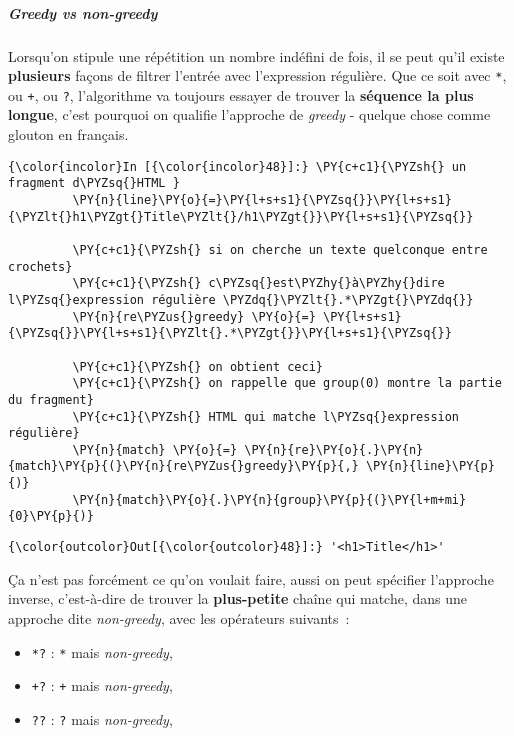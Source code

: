     \hypertarget{greedy-vs-non-greedy}{%
\subparagraph{\texorpdfstring{Greedy \emph{vs}
non-greedy}{Greedy vs non-greedy}}\label{greedy-vs-non-greedy}}

    Lorsqu'on stipule une répétition un nombre indéfini de fois, il se peut
qu'il existe \textbf{plusieurs} façons de filtrer l'entrée avec
l'expression régulière. Que ce soit avec \texttt{*}, ou \texttt{+}, ou
\texttt{?}, l'algorithme va toujours essayer de trouver la
\textbf{séquence la plus longue}, c'est pourquoi on qualifie l'approche
de \emph{greedy} - quelque chose comme glouton en français.

    \begin{Verbatim}[commandchars=\\\{\},frame=single,framerule=0.3mm,rulecolor=\color{cellframecolor}]
{\color{incolor}In [{\color{incolor}48}]:} \PY{c+c1}{\PYZsh{} un fragment d\PYZsq{}HTML }
         \PY{n}{line}\PY{o}{=}\PY{l+s+s1}{\PYZsq{}}\PY{l+s+s1}{\PYZlt{}h1\PYZgt{}Title\PYZlt{}/h1\PYZgt{}}\PY{l+s+s1}{\PYZsq{}}
         
         \PY{c+c1}{\PYZsh{} si on cherche un texte quelconque entre crochets}
         \PY{c+c1}{\PYZsh{} c\PYZsq{}est\PYZhy{}à\PYZhy{}dire l\PYZsq{}expression régulière \PYZdq{}\PYZlt{}.*\PYZgt{}\PYZdq{}}
         \PY{n}{re\PYZus{}greedy} \PY{o}{=} \PY{l+s+s1}{\PYZsq{}}\PY{l+s+s1}{\PYZlt{}.*\PYZgt{}}\PY{l+s+s1}{\PYZsq{}}
         
         \PY{c+c1}{\PYZsh{} on obtient ceci}
         \PY{c+c1}{\PYZsh{} on rappelle que group(0) montre la partie du fragment}
         \PY{c+c1}{\PYZsh{} HTML qui matche l\PYZsq{}expression régulière}
         \PY{n}{match} \PY{o}{=} \PY{n}{re}\PY{o}{.}\PY{n}{match}\PY{p}{(}\PY{n}{re\PYZus{}greedy}\PY{p}{,} \PY{n}{line}\PY{p}{)}
         \PY{n}{match}\PY{o}{.}\PY{n}{group}\PY{p}{(}\PY{l+m+mi}{0}\PY{p}{)}
\end{Verbatim}


\begin{Verbatim}[commandchars=\\\{\},frame=single,framerule=0.3mm,rulecolor=\color{cellframecolor}]
{\color{outcolor}Out[{\color{outcolor}48}]:} '<h1>Title</h1>'
\end{Verbatim}
            
    Ça n'est pas forcément ce qu'on voulait faire, aussi on peut spécifier
l'approche inverse, c'est-à-dire de trouver la \textbf{plus-petite}
chaîne qui matche, dans une approche dite \emph{non-greedy}, avec les
opérateurs suivants~:

\begin{itemize}
\tightlist
\item
  \texttt{*?} : \texttt{*} mais \emph{non-greedy},
\item
  \texttt{+?} : \texttt{+} mais \emph{non-greedy},
\item
  \texttt{??} : \texttt{?} mais \emph{non-greedy},
\end{itemize}

